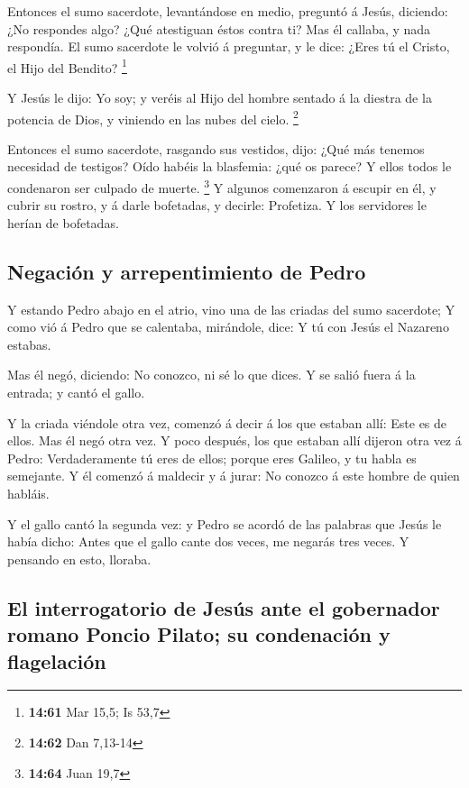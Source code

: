  Entonces el sumo sacerdote, levantándose en medio,
preguntó á Jesús, diciendo: ¿No respondes algo? ¿Qué atestiguan éstos
contra ti?  Mas él callaba, y nada respondía. El sumo
sacerdote le volvió á preguntar, y le dice: ¿Eres tú el Cristo, el Hijo
del Bendito? \footnote{\textbf{14:61} Mar 15,5; Is 53,7}

 Y Jesús le dijo: Yo soy; y veréis al Hijo del hombre
sentado á la diestra de la potencia de Dios, y viniendo en las nubes del
cielo. \footnote{\textbf{14:62} Dan 7,13-14}

 Entonces el sumo sacerdote, rasgando sus vestidos, dijo:
¿Qué más tenemos necesidad de testigos?  Oído habéis la
blasfemia: ¿qué os parece? Y ellos todos le condenaron ser culpado de
muerte. \footnote{\textbf{14:64} Juan 19,7}  Y algunos
comenzaron á escupir en él, y cubrir su rostro, y á darle bofetadas, y
decirle: Profetiza. Y los servidores le herían de bofetadas.

\hypertarget{negaciuxf3n-y-arrepentimiento-de-pedro}{%
\subsection{Negación y arrepentimiento de
Pedro}\label{negaciuxf3n-y-arrepentimiento-de-pedro}}

 Y estando Pedro abajo en el atrio, vino una de las
criadas del sumo sacerdote;  Y como vió á Pedro que se
calentaba, mirándole, dice: Y tú con Jesús el Nazareno estabas.

 Mas él negó, diciendo: No conozco, ni sé lo que dices. Y
se salió fuera á la entrada; y cantó el gallo.

 Y la criada viéndole otra vez, comenzó á decir á los que
estaban allí: Este es de ellos.  Mas él negó otra vez. Y
poco después, los que estaban allí dijeron otra vez á Pedro:
Verdaderamente tú eres de ellos; porque eres Galileo, y tu habla es
semejante.  Y él comenzó á maldecir y á jurar: No conozco
á este hombre de quien habláis.

 Y el gallo cantó la segunda vez: y Pedro se acordó de
las palabras que Jesús le había dicho: Antes que el gallo cante dos
veces, me negarás tres veces. Y pensando en esto, lloraba.

\hypertarget{el-interrogatorio-de-jesuxfas-ante-el-gobernador-romano-poncio-pilato-su-condenaciuxf3n-y-flagelaciuxf3n}{%
\subsection{El interrogatorio de Jesús ante el gobernador romano Poncio
Pilato; su condenación y
flagelación}\label{el-interrogatorio-de-jesuxfas-ante-el-gobernador-romano-poncio-pilato-su-condenaciuxf3n-y-flagelaciuxf3n}}

